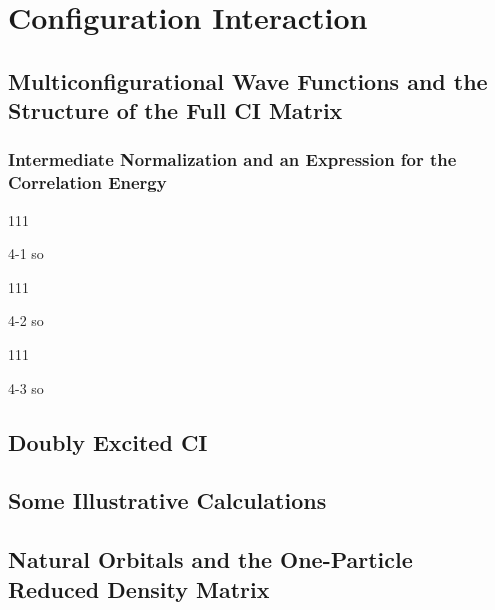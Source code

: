 \documentclass[a4paper]{book}
\begin{document}

	\chapter{Configuration Interaction}
	
	\section{Multiconfigurational Wave Functions and the Structure of the Full CI Matrix}
	
	\subsection{Intermediate Normalization and an Expression for the Correlation Energy}
	
	\begin{exercise}
	111
	\end{exercise}
	
	\begin{solution}
		4-1 so
	\end{solution}
	
	\begin{exercise}
	111
	\end{exercise}
	
	\begin{solution}
		4-2 so
	\end{solution}
	
	\begin{exercise}
	111
	\end{exercise}
	
	\begin{solution}
		4-3 so
	\end{solution}
	
	\section{Doubly Excited CI}
	
	\section{Some Illustrative Calculations}
	
	\section{Natural Orbitals and the One-Particle Reduced Density Matrix}
	
\end{document}

